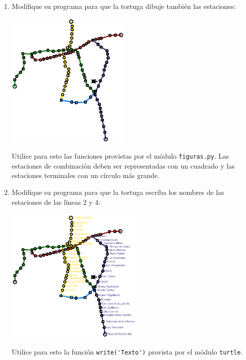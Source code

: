 \begin{enumerate}[leftmargin=0pt,label=\emph{\alph*})]
  \newpage
  \item
    Modifique su programa para que la tortuga
    dibuje también las estaciones:

    \includegraphics[height=250px]{metro/red2}

    Utilice para esto las funciones provistas
    por el módulo \texttt{figuras.py}.
    Las estaciones de combinación deben ser representadas
    con un cuadrado
    y las estaciones terminales
    con un círculo más grande.

  \newpage
  \item
    Modifique su programa para que la tortuga
    escriba los nombres de las estaciones
    de las líneas 2 y 4:

    \includegraphics[height=250px]{metro/red3}

    Utilice para esto la función \lstinline!write('Texto')!
    provista por el módulo \verb!turtle!.

\end{enumerate}


